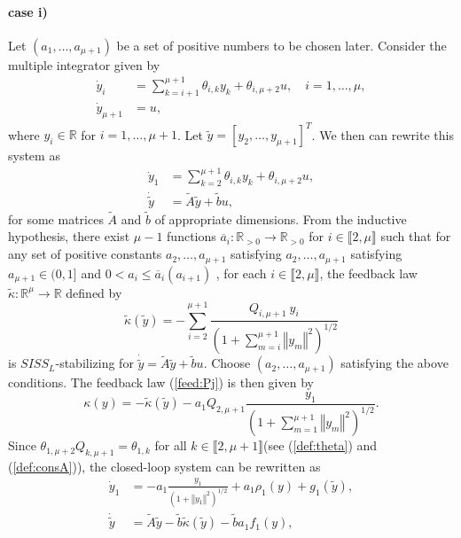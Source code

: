 \documentclass[letterpaper, 10pt]{article}
\newcommand{\rref}[1]{(\ref{#1})}
\newcommand{\norme}[1]{\left\Vert #1\right\Vert}
\newcommand{\reels}{\mathbb{R}}
\begin{document}
\paragraph{case i)} Let $(a_1 , \ldots , a_{\mu + 1})$ be a set of positive numbers to be chosen later. Consider the multiple integrator given by
\begin{align*}
\dot{y}_i &= \sum_{k=i+1}^{\mu+1 } \theta_{i,k} y_k + \theta_{i,\mu+2} u, \quad i=1 , \ldots , \mu,  \\
\dot{y}_{\mu+1 }&= u, \nonumber
\end{align*} where $y_i \in \reels$ for $i=1 , \ldots , \mu +1 $. Let $\tilde{y}=[ y_2 , \ldots , y_{\mu +1 }]^T$. We then can rewrite this system as 
\begin{align*}
\dot{y}_1 &= \sum_{k=2}^{\mu +1 } \theta_{i,k} y_k + \theta_{i,\mu+2} u,  \\
\dot{\tilde{y}} &=  \tilde{A} \tilde{y} + \tilde{b} u, \nonumber
\end{align*} for some matrices $\tilde{A}$ and $\tilde{b}$ of appropriate dimensions. From the inductive hypothesis, there exist $\mu-1$ functions $\overline{a}_i :\reels_{>0} \rightarrow \reels_{>0}$ for $i \in \llbracket 2 ,\mu  \rrbracket$ such that for any set of positive constants $a_2 , \ldots , a_{\mu +1 } $ satisfying $a_2 , \ldots , a_{\mu +1 } $ satisfying $a_{\mu +1 } \in (0,1]$ and  $0  <  a_i \leq  \overline{a}_i (a_{i +1})$ , for each $ i  \in \llbracket 2 ,\mu \rrbracket$,
the feedback law $\tilde{\kappa}:\reels^\mu \rightarrow \reels$ defined by 
\begin{equation*}
\tilde{\kappa} (\tilde{y}) =  - \sum\limits_{i=2}^{\mu +1}  \frac{ Q_{i,\mu+1} \: y_i }{(1 + \sum\limits_{m=i}^{\mu+1} \norme{y_m}^2 )^{1/2}}
\end{equation*} is $SISS_L$-stabilizing for $\dot{\tilde{y}} =  \tilde{A} \tilde{y} + \tilde{b} u$. Choose $(a_2 , \ldots , a_{\mu +1 })$ satisfying the above conditions. The feedback law \rref{feed:Pj} is then given by
\begin{equation*}
\kappa(y) = - \tilde{\kappa} (\tilde{y}) - a_1 Q_{2,\mu +1} \frac{y_1}{(1 + \sum\limits_{m=1}^{\mu +1} \norme{y_m}^2 )^{1/2}}  .
\end{equation*} Since $\theta_{1,\mu+2} Q_{k,\mu +1}= \theta_{1,k}$ for all $k \in \llbracket 2, \mu+1 \rrbracket$(see \rref{def:theta} and \rref{def:consA}), the closed-loop system can be rewritten as
\begin{align}
\label{pr:th:SYS:casei}
\dot{y}_1 & =  -  a_1 \frac{y_1}{(1 + \norme{y_1}^2 )^{1/2}} + a_1 \rho_1(y)  +  g_1(\tilde{y})    , \nonumber \\
\dot{\tilde{y}} & = \tilde{A} \tilde{y}  - \tilde{b}  \tilde{\kappa} (\tilde{y})  - \tilde{b} a_1 f_1(y)  , 
\end{align}
\end{document}
